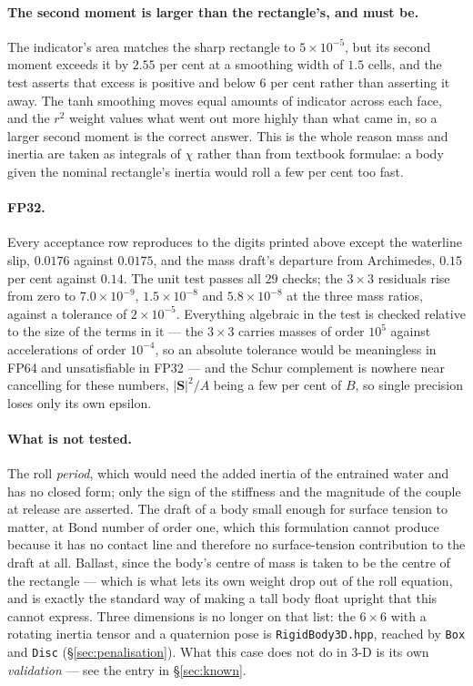 \documentclass[11pt,a4paper]{article}
\newcommand{\code}[1]{\texttt{\small #1}}
\newcommand{\e}[1]{\times 10^{#1}}
\begin{document}
\paragraph{The second moment is larger than the rectangle's, and must be.} The
indicator's area matches the sharp rectangle to $5\e{-5}$, but its second moment
exceeds it by $2.55$ per cent at a smoothing width of $1.5$ cells, and the test
asserts that excess is positive and below $6$ per cent rather than asserting it
away. The tanh smoothing moves equal amounts of indicator across each face, and
the $r^2$ weight values what went out more highly than what came in, so a larger
second moment is the correct answer. This is the whole reason mass and inertia
are taken as integrals of $\chi$ rather than from textbook formulae: a body given
the nominal rectangle's inertia would roll a few per cent too fast.

\paragraph{FP32.} Every acceptance row reproduces to the digits printed above
except the waterline slip, $0.0176$ against $0.0175$, and the mass draft's
departure from Archimedes, $0.15$ per cent against $0.14$. The unit test passes
all $29$ checks; the $3\times3$ residuals rise from zero to $7.0\e{-9}$,
$1.5\e{-8}$ and $5.8\e{-8}$ at the three mass ratios, against a tolerance of
$2\e{-5}$. Everything algebraic in the test is checked relative to the size of
the terms in it --- the $3\times3$ carries masses of order $10^5$ against
accelerations of order $10^{-4}$, so an absolute tolerance would be meaningless
in FP64 and unsatisfiable in FP32 --- and the Schur complement is nowhere near
cancelling for these numbers, $|\bm{S}|^2\!/A$ being a few per cent of $B$, so
single precision loses only its own epsilon.

\paragraph{What is not tested.} The roll \emph{period}, which would need the added
inertia of the entrained water and has no closed form; only the sign of the
stiffness and the magnitude of the couple at release are asserted. The draft of a
body small enough for surface tension to matter, at Bond number of order one,
which this formulation cannot produce because it has no contact line and
therefore no surface-tension contribution to the draft at all. Ballast, since the
body's centre of mass is taken to be the centre of the rectangle --- which is
what lets its own weight drop out of the roll equation, and is exactly the
standard way of making a tall body float upright that this cannot express. Three
dimensions is no longer on that list: the $6\times6$ with a rotating inertia
tensor and a quaternion pose is \code{RigidBody3D.hpp}, reached by \code{Box} and
\code{Disc} (\S\ref{sec:penalisation}). What this case does not do in 3-D is its own
\emph{validation} --- see the entry in \S\ref{sec:known}.
\end{document}
